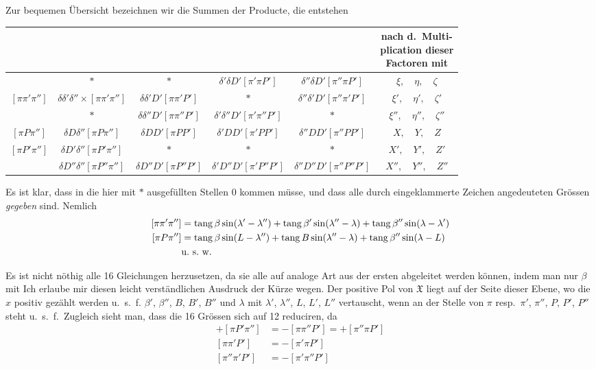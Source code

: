 Zur bequemen Übersicht bezeichnen wir die Summen der Producte, die entstehen
\begin{center}\begingroup\fontsize{9}{11}\selectfont\setlength{\tabcolsep}{.8pt}
\begin{tabular}{c|c|c|c|c|c}
&&&&&\shortstack{nach d.\ Multi-\\plication dieser\\Factoren mit}\\\hline
&$*$&$*$&$\delta'\delta D'[\pi'\pi P']$&$\delta''\delta D'[\pi''\pi P']$&$\xi,\quad\eta,\quad\zeta$\\
$[\pi\pi'\pi'']$&$\delta\delta'\delta''\times[\pi\pi'\pi'']$&$\delta\delta'D'[\pi\pi'P']$&$*$&$\delta''\delta'D'[\pi''\pi'P']$&$\xi',\quad\eta',\quad\zeta'$\\
&$*$&$\delta\delta''D'[\pi\pi''P']$&$\delta'\delta''D'[\pi'\pi''P']$&$*$&$\xi'',\quad\eta'',\quad\zeta''$\\
$[\pi P\pi'']$&$\delta D\delta''[\pi P\pi'']$&$\delta DD'[\pi PP']$&$\delta'DD'[\pi'PP']$&$\delta''DD'[\pi''PP']$&$X,\quad Y,\quad Z$\\
$[\pi P'\pi'']$&$\delta D'\delta''[\pi P'\pi'']$&$*$&$*$&$*$&$X',\quad Y',\quad Z'$\\
&$\delta D''\delta''[\pi P''\pi'']$&$\delta D''D'[\pi P''P']$&$\delta'D''D'[\pi'P''P']$&$\delta''D''D'[\pi''P''P']$&$X'',\quad Y'',\quad Z''$
\end{tabular}\endgroup\end{center}
Es ist klar, dass in die hier mit $*$ ausgefüllten Stellen $0$ kommen müsse, und dass alle durch eingeklammerte Zeichen angedeuteten Grössen \emph{gegeben} sind. Nemlich
\[
\begin{aligned}\relax
[\pi\pi'\pi'']&=\operatorname{tang}\beta\sin(\lambda'-\lambda'')+\operatorname{tang}\beta'\sin(\lambda''-\lambda)+\operatorname{tang}\beta''\sin(\lambda-\lambda')\\
[\pi P\pi'']&=\operatorname{tang}\beta\sin(L-\lambda'')+\operatorname{tang}B\sin(\lambda''-\lambda)+\operatorname{tang}\beta''\sin(\lambda-L)\\
&\text{u.\ s.\ w.}
\end{aligned}
\]

Es ist nicht nöthig alle 16 Gleichungen herzusetzen, da sie alle auf analoge Art aus der ersten abgeleitet werden können, indem man nur $\beta$ mit
\expandafter\def\csname HistoricalNoteText9\endcsname{Ich erlaube mir diesen leicht verständlichen Ausdruck der Kürze wegen. Der positive Pol von $\mathfrak{X}$ liegt auf der Seite dieser Ebene, wo die $x$ positiv gezählt werden u.\ s.\ f.}%
%
$\beta'$, $\beta''$, $B$, $B'$, $B''$ und $\lambda$ mit $\lambda'$, $\lambda''$, $L$, $L'$, $L''$ vertauscht, wenn an der Stelle von $\pi$ resp.\ $\pi'$, $\pi''$, $P$, $P'$, $P''$ steht u.\ s.\ f.\ Zugleich sieht man, dass die 16 Grössen sich auf 12 reduciren, da
\[
\begin{aligned}
+[\pi P'\pi'']&=-[\pi\pi''P']=+[\pi''\pi P']\\
[\pi\pi'P']&=-[\pi'\pi P']\\
[\pi''\pi'P']&=-[\pi'\pi''P']
\end{aligned}
\]

